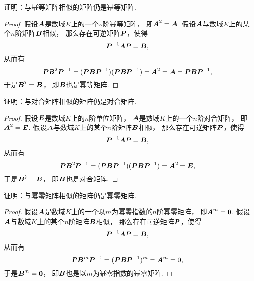 \begin{example}\label{example:幂等矩阵.幂等矩阵的相似类}
证明：与幂等矩阵相似的矩阵仍是幂等矩阵.
\begin{proof}
假设\(\boldsymbol{A}\)是数域\(K\)上的一个\(n\)阶幂等矩阵，
即\(\boldsymbol{A}^2=\boldsymbol{A}\).
假设\(\boldsymbol{A}\)与数域\(K\)上的某个\(n\)阶矩阵\(\boldsymbol{B}\)相似，
那么存在可逆矩阵\(\boldsymbol{P}\)，使得\[
	\boldsymbol{P}^{-1}\boldsymbol{A}\boldsymbol{P} = \boldsymbol{B},
\]
从而有\[
	\boldsymbol{P}\boldsymbol{B}^2\boldsymbol{P}^{-1}
	= (\boldsymbol{P}\boldsymbol{B}\boldsymbol{P}^{-1})(\boldsymbol{P}\boldsymbol{B}\boldsymbol{P}^{-1})
	= \boldsymbol{A}^2
	= \boldsymbol{A}
	= \boldsymbol{P}\boldsymbol{B}\boldsymbol{P}^{-1},
\]
于是\(\boldsymbol{B}^2=\boldsymbol{B}\)，
即\(\boldsymbol{B}\)也是幂等矩阵.
\end{proof}
\end{example}
\begin{example}\label{example:对合矩阵.对合矩阵的相似类}
证明：与对合矩阵相似的矩阵仍是对合矩阵.
\begin{proof}
假设\(\boldsymbol{E}\)是数域\(K\)上的\(n\)阶单位矩阵，
\(\boldsymbol{A}\)是数域\(K\)上的一个\(n\)阶对合矩阵，
即\(\boldsymbol{A}^2=\boldsymbol{E}\).
假设\(\boldsymbol{A}\)与数域\(K\)上的某个\(n\)阶矩阵\(\boldsymbol{B}\)相似，
那么存在可逆矩阵\(\boldsymbol{P}\)，使得\[
	\boldsymbol{P}^{-1}\boldsymbol{A}\boldsymbol{P} = \boldsymbol{B},
\]
从而有\[
	\boldsymbol{P}\boldsymbol{B}^2\boldsymbol{P}^{-1}
	= (\boldsymbol{P}\boldsymbol{B}\boldsymbol{P}^{-1})(\boldsymbol{P}\boldsymbol{B}\boldsymbol{P}^{-1})
	= \boldsymbol{A}^2
	= \boldsymbol{E},
\]
于是\(\boldsymbol{B}^2=\boldsymbol{E}\)，
即\(\boldsymbol{B}\)也是对合矩阵.
\end{proof}
\end{example}
\begin{example}\label{example:幂零矩阵.幂零矩阵的相似类}
证明：与幂零矩阵相似的矩阵仍是幂零矩阵.
\begin{proof}
假设\(\boldsymbol{A}\)是数域\(K\)上的一个以\(m\)为幂零指数的\(n\)阶幂零矩阵，
即\(\boldsymbol{A}^m=\boldsymbol0\).
假设\(\boldsymbol{A}\)与数域\(K\)上的某个\(n\)阶矩阵\(\boldsymbol{B}\)相似，
那么存在可逆矩阵\(\boldsymbol{P}\)，使得\[
	\boldsymbol{P}^{-1}\boldsymbol{A}\boldsymbol{P} = \boldsymbol{B},
\]
从而有\[
	\boldsymbol{P}\boldsymbol{B}^m\boldsymbol{P}^{-1}
	= (\boldsymbol{P}\boldsymbol{B}\boldsymbol{P}^{-1})^m
	= \boldsymbol{A}^m
	= \boldsymbol0,
\]
于是\(\boldsymbol{B}^m=\boldsymbol0\)，
即\(\boldsymbol{B}\)也是以\(m\)为幂零指数的幂零矩阵.
\end{proof}
\end{example}
